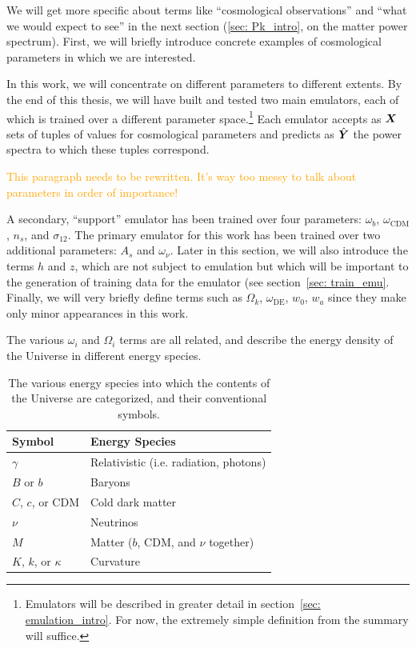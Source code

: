 We will get more specific about terms like ``cosmological observations''
and ``what we would expect to see'' in the next section (\ref{sec: Pk_intro}, 
on the matter power spectrum). First, we will briefly introduce concrete
examples of cosmological parameters in which we are interested.

In this work, we will concentrate on different parameters to different 
extents. By the end of this thesis, we will have built and tested two main
emulators, each of which is trained over a different parameter
space.\footnote{Emulators will be described in greater detail in
section~\ref{sec: emulation_intro}. For now, the extremely simple definition 
from the summary will suffice.}
Each emulator accepts as $\bm{X}$ sets of tuples of values for cosmological 
parameters and predicts as $\hat{\bm{Y}}$ the power spectra to which these
tuples correspond. 


\textcolor{orange}{This paragraph needs to be rewritten. It's way too messy to 
talk about parameters in order of importance!}

A secondary, ``support'' emulator has been trained over four parameters:
$\omega_b$, $\omega_\text{CDM}$, $n_s$, and $\sigma_{12}$.
The primary emulator for this work has been trained over two additional
parameters: $A_s$ and $\omega_\nu$. Later in this section, we will also 
introduce the terms $h$ and $z$, which are not subject to emulation but which 
will be important to the generation of training data for the emulator (see 
section~\ref{sec: train_emu}. Finally, we will very briefly define terms such 
as $\Omega_k$, $\omega_\text{DE}$, $w_0$, $w_a$ since they make only minor 
appearances in this work.


The various $\omega_i$ and $\Omega_i$ terms are all related, and describe the
energy density of the Universe in different energy species.



\begin{table}[htb]
\centering
\begin{tabular}{l|l}
\hline
Symbol & Energy Species \\ \hline
$\gamma$ & Relativistic (i.e. radiation, photons) \\
$B$ or $b$ & Baryons \\
$C$, $c$, or CDM & Cold dark matter \\
$\nu$ & Neutrinos \\
$M$ & Matter ($b$, CDM, and $\nu$ together) \\
$K$, $k$, or $\kappa$ & Curvature \\ \hline
\end{tabular}
 \caption[Energy species symbols]{The various energy species into which the 
 	contents of the Universe are categorized, and their conventional symbols.}
 \label{tab: species_symbols}
\end{table}

